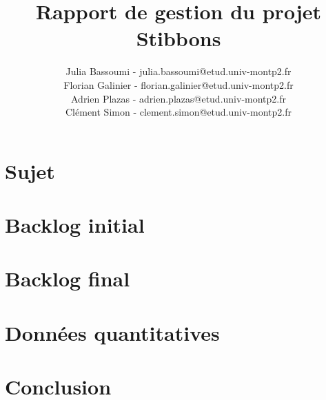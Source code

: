 \documentclass[a4paper,11pt]{report}
\title{Rapport de gestion du projet Stibbons}
\author{Julia Bassoumi - julia.bassoumi@etud.univ-montp2.fr\\Florian Galinier - florian.galinier@etud.univ-montp2.fr\\Adrien Plazas - adrien.plazas@etud.univ-montp2.fr\\Clément Simon - clement.simon@etud.univ-montp2.fr}
\begin{document}
\maketitle
\tableofcontents

\chapter{Sujet}


\chapter{Backlog initial}


\chapter{Backlog final}


\chapter{Données quantitatives}


\chapter{Conclusion}

\end{document}
